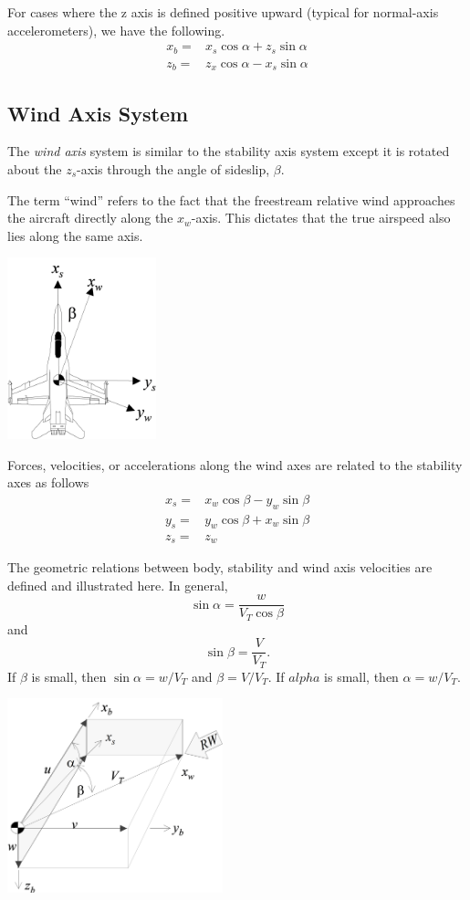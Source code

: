 \documentclass[
]{book}
\begin{document}
For cases where the z axis is defined positive upward (typical for normal-axis accelerometers), we have the following.
\begin{align}
x_b =& x_s \cos \alpha + z_s \sin \alpha \\
z_b =& z_x \cos \alpha - x_s \sin \alpha
\end{align}

\hypertarget{wind-axis-system}{%
\subsection{Wind Axis System}\label{wind-axis-system}}

The \emph{wind axis} system is similar to the stability axis system except it is rotated about the \(z_s\)-axis through the angle of sideslip, \(\beta\).

The term ``wind'' refers to the fact that the freestream relative wind approaches the aircraft directly along the \(x_w\)-axis. This dictates that the true airspeed also lies along the same axis.

\includegraphics[width=1.69931in,height=2.07014in]{media/06/image5.svg}

Forces, velocities, or accelerations along the wind axes are related to the stability axes as follows
\begin{align}
x_s =&x_w \cos \beta - y_w \sin \beta \\
y_s =& y_w \cos \beta + x_w \sin \beta \\
z_s =& z_w
\end{align}

The geometric relations between body, stability and wind axis velocities are defined and illustrated here. In general,
\[ \sin \alpha = \frac{w}{V_T \cos \beta}\] and
\[\sin \beta = \frac{V}{V_T}.\]
If \(\beta\) is small, then \(\sin \alpha = w/V_T\) and \(\beta = V / V_T\). If \(alpha\) is small, then \(\alpha = w/V_T\).

\includegraphics[width=2.45903in,height=2.21875in]{media/06/image6.svg}
\end{document}
